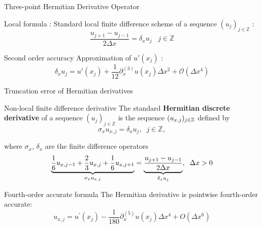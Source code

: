 \documentclass[11pt]{beamer}
\begin{document}
\begin{frame}{Three-point Hermitian Derivative Operator}

\begin{block}{Local formula : }
Standard local finite difference scheme of a sequence $(u_j)_{j \in \mathbb{Z}}$ :
\begin{equation}
\dfrac{u_{j+1}-u_{j-1}}{2\Delta x} = \delta_x u_j \;\;\; j \in \mathbb{Z}
\end{equation}
\end{block}

\begin{block}{Second order accuracy}
Approximation of $u'(x_j)$ :
\begin{equation}
\delta_x u_j = u'(x_j) + \dfrac{1}{12} \partial_x^{(3)} u(x_j) \Delta x^2 + \mathcal{O}(\Delta x^4)
\end{equation}
\end{block}


\end{frame}

\begin{frame}{Truncation error of Hermitian derivatives}
\begin{block}{Non-local finite difference derivative}
The standard {\bf Hermitian discrete derivative} of a sequence 
$(u_j)_{j \in \mathbb{Z}}$ is 
the sequence $(u_{x,j})_{j \in \Bbb Z}$ defined by
\begin{equation}
\sigma_x u_{x,j}=\delta_x u_j,\;\; j \in \mathbb{Z},
\end{equation}

where
$\sigma_x$, $\delta_x$ are the finite difference operators
\begin{equation}
\underbrace{\frac{1}{6}u_{x,j-1}+\frac{2}{3}u_{x,j}+\frac{1}{6}u_{x,j+1}}_{\sigma_x u_{x,j}} 
= 
\underbrace{{ u_{j+1}-u_{j-1} \over 2 \Delta x}}_{\delta_x u_j},\;\; \Delta x >0
\end{equation}

\end{block}

\begin{block}{Fourth-order accurate formula}
The Hermitian derivative is pointwise fourth-order accurate:
\begin{equation}
u_{x,j}=u^\prime(x_j)-\frac{1}{180}\partial_x^{(5)} u(x_j)\Delta x^4+O(\Delta x^6)
\end{equation}
\end{block}


\end{frame}
\end{document}
